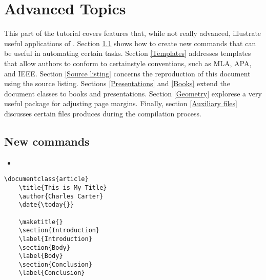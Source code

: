 	
	\section{Advanced Topics}
	\label{Advanced Topics}

    This part of the tutorial covers features that, while not really advanced, illustrate useful applications of \Lx{}. Section \ref{New commands} shows how to create new \Lx{} commands that can be useful in automating certain tasks. Section \ref{Templates} addresses templates that allow authors to conform to certainstyle conventions, such as MLA, APA, and IEEE. Section \ref{Source listing} concerns the reproduction of this document using the source listing. Sections \ref{Presentations} and \ref{Books} extend the \Lx{} document classes to books and presentations. Section \ref{Geometry} explorese a very useful package for adjusting page margins. Finally, section \ref{Auxiliary files} discusses certain files \Lx{} produces during the compilation process.

        \subsection{New commands}
        \label{New commands}
        
        \begin{framed}
            \begin{itemize}
                \item{}
            \end{itemize}
        \end{framed}


        \begin{verbatim}
\documentclass{article}
    \title{This is My Title}
    \author{Charles Carter}
    \date{\today{}}
 
    \maketitle{}
    \section{Introduction}
    \label{Introduction}
    \section{Body}
    \label{Body}
    \section{Conclusion}
    \label{Conclusion}
    
        \end{verbatim}

